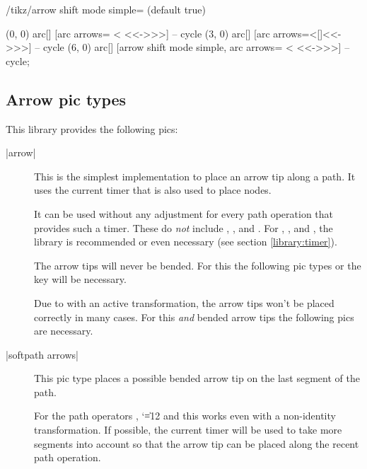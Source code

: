 \begin{multicols}{2}
\begin{key}{/tikz/arrow shift mode simple= (default true)}
\begin{codeexample}[preamble=\usetikzlibrary{bending, ext.arrows-plus}]
\tikz[>={Stealth[color=red, round]}, arrows={[bend]}, ultra thick]
  \draw[start angle=0, end angle=360, radius=1,
        every arc arrows/.style={pos <=.25, pos >=.75}]
    (0, 0) arc[] [arc arrows= <  <<->>>]  -- cycle
    (3, 0) arc[] [arc arrows={<[]<<->>>}] -- cycle
    (6, 0) arc[] [arrow shift mode simple,
                  arc arrows= <  <<->>>]  -- cycle;
\end{codeexample}
\end{key}

\subsection{Arrow pic types}

This library provides the following pics:
\begin{description}
\item[|arrow|]
  This is the simplest implementation to place an arrow tip along a path.
  It uses the current timer that is also used to place nodes.
  
  It can be used without any adjustment for every path operation that provides such a timer.
  These do \emph{not} include
  ,
  ,
   and
  .
  For ,
      ,
       and
      ,
  the  library is recommended or even necessary
  (see section \ref{library:timer}).
  
  The arrow tips will never be bended. For this the following pic types
  or the  key will be necessary.

  Due to \cite{PgfIssueSloped} with an active transformation,
  the arrow tips won't be placed correctly in many cases.
  For this \emph{and} bended arrow tips the following pics are necessary.
  
\item[|softpath arrows|]
  This pic type places a possible bended arrow tip on the last segment of the path.
  
  For the path operators ,
  {\catcode`\|=12 
              and }
  this works even with a non-identity transformation.
  If possible, the current timer will be used to take more segments into account so
  that the arrow tip can be placed along the recent path operation.
  

\end{description}
\end{multicols}
